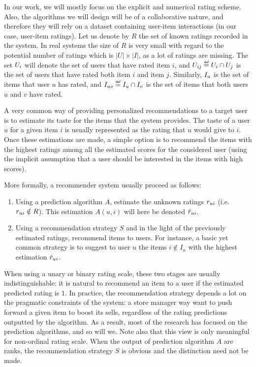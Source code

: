 In our work, we will mostly focus on the explicit and numerical rating scheme.
Also, the algorithms we will design will be of a collaborative nature, and
therefore they will rely on a dataset containing user-item interactions (in our
case, user-item ratings).
Let us denote by $R$ the set of known ratings recorded in the system. In real
systems the size of $R$ is very small with regard to the potential number of
ratings which is $|U| \times |I|$, as a lot of ratings are missing. The set
$U_i$ will denote the set of users that have rated item $i$, and $\Uij \eqdef
U_i \cap U_j$ is the set of users that have rated both item $i$ and item $j$.
Similarly, $I_u$ is the set of items that user $u$ has rated, and $\Iuv \eqdef
I_u \cap I_v$ is the set of items that both users $u$ and $v$ have rated.

A very common way of providing personalized recommendations to a target user is
to estimate its taste for the items that the system provides. The taste of a
user $u$ for a given item $i$ is usually represented as the rating that $u$
would give to $i$.  Once these estimations are made, a simple option is to
recommend the items with the highest ratings among all the estimated scores for
the considered user (using the implicit assumption that a user should be
interested in the items with high scores).

More formally, a recommender system usually proceed as follows:
\begin{enumerate}
\item Using a prediction algorithm $A$, estimate the unknown ratings $r_{ui}$
  (i.e. $r_{ui} \notin R$). This estimation $A(u, i)$ will here be denoted
    $\hat{r}_{ui}$.
\item Using a recommendation strategy $S$ and in the light of the previously
  estimated ratings, recommend items to users. For instance, a basic yet common
    strategy is to suggest to user $u$ the items $i \notin I_u$ with the
    highest estimation $\hat{r}_{ui}$.
\end{enumerate}

When using a unary or binary rating scale, these two stages are usually
indistinguishable: it is natural to recommend an item to a user if the
estimated predicted rating is $1$. In practice, the recommendation strategy
depends a lot on the pragmatic constraints of the system: a store manager way
want to push forward a given item to boost its sells, regardless of the
rating predictions outputted by the algorithm. As a result, most of the
research has focused on the prediction algorithms, and so will we. Note also
that this view is only meaningful for non-ordinal rating scale. When the output
of prediction algorithm $A$ are ranks, the recommendation strategy $S$ is
obvious and the distinction need not be made.

